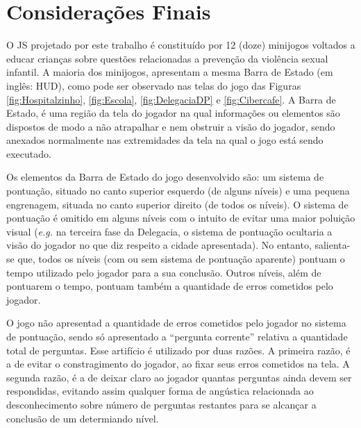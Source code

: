 
\section{Considerações Finais}\label{sec:fim}

O \acf{JS} projetado por este trabalho é constituído por 12 (doze) minijogos voltados a educar crianças sobre questões relacionadas a prevenção da violência sexual infantil. A maioria dos minijogos, apresentam a mesma Barra de Estado (em inglês: \acl{HUD}), como pode ser observado nas telas do jogo das Figuras \ref{fig:Hospitalzinho}, \ref{fig:Escola}, \ref{fig:DelegaciaDP} e \ref{fig:Cibercafe}. A Barra de Estado, é uma região da tela do jogador na qual informações ou elementos são dispostos de modo a não atrapalhar e nem obstruir a visão do jogador, sendo anexados normalmente nas extremidades da tela na qual o jogo está sendo executado. %

Os elementos da Barra de Estado do jogo desenvolvido são: um sistema de pontuação, situado no canto superior esquerdo (de alguns níveis) e uma pequena engrenagem, situada no canto superior direito (de todos os níveis). O sistema de pontuação é omitido em alguns níveis com o intuito de evitar uma maior poluição visual (\textit{e.g.} na terceira fase da Delegacia, o sistema de pontuação ocultaria a visão do jogador no que diz respeito a cidade apresentada). No entanto, salienta-se que, todos os níveis (com ou sem sistema de pontuação aparente) pontuam o tempo utilizado pelo jogador para a sua conclusão. Outros níveis, além de pontuarem o tempo, pontuam também a quantidade de erros cometidos pelo jogador. 

O jogo não apresentad a quantidade de erros cometidos pelo jogador no sistema de pontuação, sendo só apresentado a ``pergunta corrente'' relativa a quantidade total de perguntas. Esse artifício é utilizado por duas razões. A primeira razão, é a de evitar o constragimento do jogador, ao fixar seus erros cometidos na tela. A segunda razão, é a de deixar claro ao jogador quantas perguntas ainda devem ser respondidas, evitando assim qualquer forma de angústica relacionada ao desconhecimento sobre número de perguntas restantes para se alcançar a conclusão de um determiando nível.

